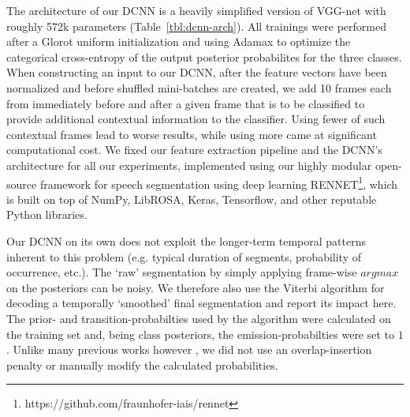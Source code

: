 \documentclass[a4paper]{article}
\begin{document}
The architecture of our DCNN is a heavily simplified version of VGG-net \cite{simonyan_very_2014}
with roughly 572k parameters (Table~\ref{tbl:dcnn-arch}).
All trainings were performed after a Glorot uniform initialization and using Adamax to optimize the categorical cross-entropy of the output posterior probabilites for the three classes.
When constructing an input to our DCNN,
after the feature vectors have been normalized and before shuffled mini-batches are created,
we add 10 frames each from immediately before and after a given frame that is to be classified
to provide additional contextual information to the classifier.
Using fewer of such contextual frames lead to worse results,
while using more came at significant computational cost.
We fixed our feature extraction pipeline and the DCNN's architecture for all our experiments,
implemented using our highly modular open-source framework for
speech segmentation using deep learning
RENNET\footnote{https://github.com/fraunhofer-iais/rennet},
which is built on top of NumPy, LibROSA, Keras, Tensorflow, and other reputable Python libraries.

Our DCNN on its own does not exploit the longer-term temporal patterns inherent to this problem
(e.g. typical duration of segments, probability of occurrence, etc.).
The `raw' segmentation by simply applying frame-wise $argmax$ on the posteriors can be noisy.
We therefore also use the Viterbi algorithm \cite{rabiner_tutorial_1989} for decoding a temporally `smoothed' final segmentation and report its impact here.
The prior- and transition-probabilties used by the algorithm were calculated on the training set and,
being class posteriors, the emission-probabilties were set to $1$.
Unlike many previous works however
\cite{zelenak_simultaneous_2012,zelenak_speaker_2012,GeigerUsinglinguisticinformation2013,geiger_detecting_2013,yella_overlapping_2014},
we did not use an overlap-insertion penalty or manually modify the calculated probabilities.

\end{document}
